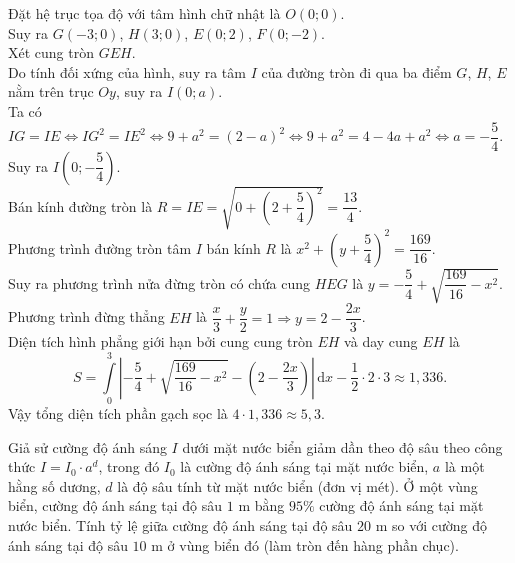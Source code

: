 \begin{ex}
{\begin{center}
		\end{center}
		Đặt hệ trục tọa độ với tâm hình chữ nhật là $O(0;0)$.\\
		Suy ra $G(-3;0)$, $H(3;0)$, $E(0;2)$, $F(0;-2)$.\\
		Xét cung tròn $GEH$.\\
		Do tính đối xứng của hình, suy ra tâm $I$ của đường tròn đi qua ba điểm $G$, $H$, $E$ nằm trên trục $Oy$, suy ra $I(0;a)$.\\
		Ta có $IG=IE\Leftrightarrow IG^2=IE^2\Leftrightarrow 9+a^2=(2-a)^2\Leftrightarrow 9+a^2=4-4a+a^2\Leftrightarrow a=-\dfrac{5}{4}$.\\
		Suy ra $I\left(0;-\dfrac{5}{4}\right)$.\\
		Bán kính đường tròn là $R=IE=\sqrt{0+\left(2+\dfrac{5}{4}\right)^2}=\dfrac{13}{4}$.\\
		Phương trình đường tròn tâm $I$ bán kính $R$ là $x^2+\left(y+\dfrac{5}{4}\right)^2=\dfrac{169}{16}$.\\
		Suy ra phương trình nửa đừng tròn có chứa cung $HEG$ là $y=-\dfrac{5}{4}+\sqrt{\dfrac{169}{16}-x^2}$.\\
		Phương trình đừng thẳng $EH$ là $\dfrac{x}{3}+\dfrac{y}{2}=1\Rightarrow y=2-\dfrac{2x}{3}$.\\
		Diện tích hình phẳng giới hạn bởi cung cung tròn $EH$ và day cung $EH$ là
		$$S=\displaystyle\int\limits_0^3\left|-\dfrac{5}{4}+\sqrt{\dfrac{169}{16}-x^2}-\left(2-\dfrac{2x}{3}\right)\right|\mathrm{\,d}x-\dfrac{1}{2}\cdot 2\cdot 3\approx 1{,}336.$$
	Vậy tổng diện tích phần gạch sọc là $4\cdot 1{,}336\approx 5{,}3$.
	}
\end{ex}
\begin{ex}%
	Giả sử cường độ ánh sáng $I$ dưới mặt nước biển giảm dần theo độ sâu theo công thức $I=I_0\cdot a^d$, trong đó $I_0$ là cường độ ánh sáng tại mặt nước biển, $a$ là một hằng số dương, $d$ là độ sâu tính từ mặt nước biển (đơn vị mét). Ở một vùng biển, cường độ ánh sáng tại độ sâu $1$ m bằng $95\%$ cường độ ánh sáng tại mặt nước biển. Tính tỷ lệ giữa cường độ ánh sáng tại độ sâu $20$ m so với cường độ ánh sáng tại độ sâu $10$ m ở vùng biển đó (làm tròn đến hàng phần chục).
	\par
\end{ex}
